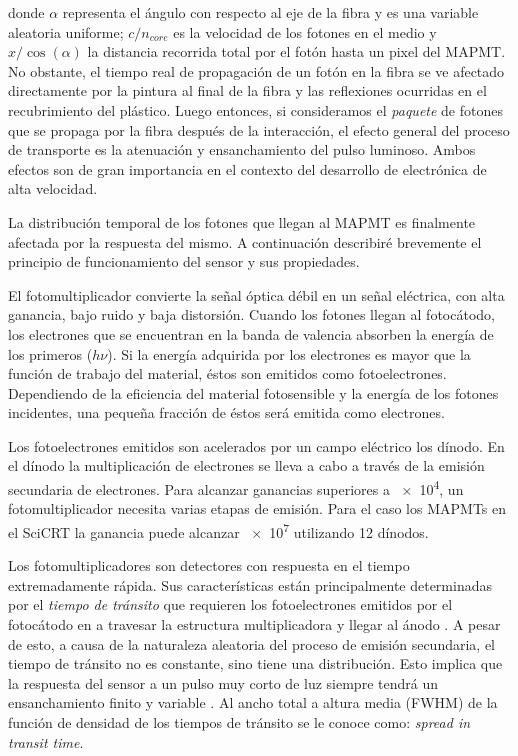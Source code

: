 donde $\alpha$ representa el ángulo con respecto al eje de la fibra y es una variable aleatoria uniforme; $c/n_{core}$ es la velocidad de los fotones en el medio y $x/\cos(\alpha)$ la distancia recorrida total por el fotón hasta un pixel del MAPMT. No obstante, el tiempo real de propagación de un fotón en la fibra se ve afectado directamente por la pintura al final de la fibra y las reflexiones ocurridas en el recubrimiento del plástico. Luego entonces, si consideramos el \emph{paquete} de fotones que se propaga por la fibra después de la interacción, el efecto general del proceso de transporte es la atenuación y ensanchamiento del pulso luminoso. Ambos efectos son de gran importancia en el contexto del desarrollo de electrónica de alta velocidad.

La distribución temporal de los fotones que llegan al MAPMT es finalmente afectada por la respuesta del mismo. A continuación describiré brevemente el principio de funcionamiento del sensor y sus propiedades.

El fotomultiplicador convierte la señal óptica débil en un señal eléctrica, con alta ganancia, bajo ruido y baja distorsión. Cuando los fotones llegan al fotocátodo, los electrones que se encuentran en la banda de valencia absorben la energía de los primeros ($h\nu$). Si la energía adquirida por los electrones es mayor que la función de trabajo del material, éstos son emitidos como fotoelectrones. Dependiendo de la eficiencia del material fotosensible y la energía de los fotones incidentes, una pequeña fracción de éstos será emitida como electrones.

Los fotoelectrones emitidos son acelerados por un campo eléctrico los dínodo. En el dínodo la multiplicación de electrones se lleva a cabo a través de la emisión secundaria de electrones. Para alcanzar ganancias superiores a \num{e4}, un fotomultiplicador necesita varias etapas de emisión. Para el caso los MAPMTs en el SciCRT la ganancia puede alcanzar \num{e7} utilizando \num{12} dínodos.

Los fotomultiplicadores son detectores con respuesta en el tiempo extremadamente rápida. Sus características están principalmente determinadas por el \emph{tiempo de tránsito} que requieren los fotoelectrones emitidos por el fotocátodo en a travesar la estructura multiplicadora y llegar al ánodo \cite{hama07}. A pesar de esto, a causa de la naturaleza aleatoria del proceso de emisión secundaria, el tiempo de tránsito no es constante, sino tiene una distribución. Esto implica que la respuesta del sensor a un pulso muy corto de luz siempre tendrá un ensanchamiento finito y variable \cite{syed07}. Al ancho total a altura media (FWHM) de la función de densidad de los tiempos de tránsito se le conoce como: \emph{spread in transit time}.

